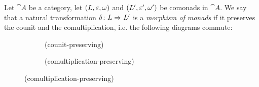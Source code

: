 \begin{definition}
    Let $\cat{A}$ be a category, let $(L,\eps,\omega)$ and $(L',\eps',\omega')$ be comonads in $\cat{A}$.
    We say that a natural transformation $\nat[\delta]{L}{L'}$ is a \textit{morphism of monads} if it preserves
    the counit and the comultiplication, i.e. the following diagrams commute:
    \begin{figure}[H]
    \centering
    \begin{subfigure}{0.4\textwidth}
    \centering
    \caption*{(counit-preserving)}
    \end{subfigure}
    \hspace{2em}
    \begin{subfigure}{0.4\textwidth}
    \centering
    \caption*{(comultiplication-preserving)}
    \end{subfigure}
    \end{figure} 
\end{definition}
